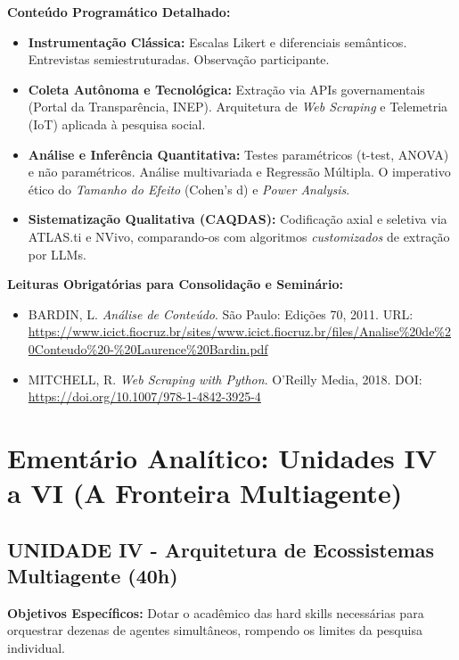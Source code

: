 \documentclass[12pt,a4paper]{article}
\begin{document}
\textbf{Conteúdo Programático Detalhado:}
\begin{itemize}
    \item \textbf{Instrumentação Clássica:} Escalas Likert e diferenciais semânticos. Entrevistas semiestruturadas. Observação participante.
    \item \textbf{Coleta Autônoma e Tecnológica:} Extração via APIs governamentais (Portal da Transparência, INEP). Arquitetura de \textit{Web Scraping} e Telemetria (IoT) aplicada à pesquisa social.
    \item \textbf{Análise e Inferência Quantitativa:} Testes paramétricos (t-test, ANOVA) e não paramétricos. Análise multivariada e Regressão Múltipla. O imperativo ético do \textit{Tamanho do Efeito} (Cohen's d) e \textit{Power Analysis}.
    \item \textbf{Sistematização Qualitativa (CAQDAS):} Codificação axial e seletiva via ATLAS.ti e NVivo, comparando-os com algoritmos \textit{customizados} de extração por LLMs.
\end{itemize}

\textbf{Leituras Obrigatórias para Consolidação e Seminário:}
\begin{itemize}
    \item BARDIN, L. \textit{Análise de Conteúdo}. São Paulo: Edições 70, 2011. URL: \url{https://www.icict.fiocruz.br/sites/www.icict.fiocruz.br/files/Analise%20de%20Conteudo%20-%20Laurence%20Bardin.pdf}
    \item MITCHELL, R. \textit{Web Scraping with Python}. O'Reilly Media, 2018. DOI: \url{https://doi.org/10.1007/978-1-4842-3925-4}
\end{itemize}

\newpage
\section{Ementário Analítico: Unidades IV a VI (A Fronteira Multiagente)}

\subsection{UNIDADE IV - Arquitetura de Ecossistemas Multiagente (40h)}
\textbf{Objetivos Específicos:} Dotar o acadêmico das hard skills necessárias para orquestrar dezenas de agentes simultâneos, rompendo os limites da pesquisa individual.
\end{document}
